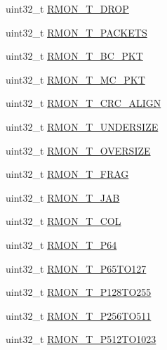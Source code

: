 \begin{DoxyCompactItemize}
\item 
uint32\+\_\+t \hyperlink{struct_e_n_e_t___mem_map_ad0d6e8aa41799a8c53de16163b293e44}{R\+M\+O\+N\+\_\+\+T\+\_\+\+D\+R\+O\+P}
\item 
uint32\+\_\+t \hyperlink{struct_e_n_e_t___mem_map_a50d2a3b07b1bc8cffcb140f1f1830aeb}{R\+M\+O\+N\+\_\+\+T\+\_\+\+P\+A\+C\+K\+E\+T\+S}
\item 
uint32\+\_\+t \hyperlink{struct_e_n_e_t___mem_map_ae71447acacfe736236413a9872954541}{R\+M\+O\+N\+\_\+\+T\+\_\+\+B\+C\+\_\+\+P\+K\+T}
\item 
uint32\+\_\+t \hyperlink{struct_e_n_e_t___mem_map_ac8d2c6366107a9a30857cb24e064b07a}{R\+M\+O\+N\+\_\+\+T\+\_\+\+M\+C\+\_\+\+P\+K\+T}
\item 
uint32\+\_\+t \hyperlink{struct_e_n_e_t___mem_map_a91748ae65113321a609bfe426b10dcaf}{R\+M\+O\+N\+\_\+\+T\+\_\+\+C\+R\+C\+\_\+\+A\+L\+I\+G\+N}
\item 
uint32\+\_\+t \hyperlink{struct_e_n_e_t___mem_map_aae80607f8598aca7702cb202de169cf2}{R\+M\+O\+N\+\_\+\+T\+\_\+\+U\+N\+D\+E\+R\+S\+I\+Z\+E}
\item 
uint32\+\_\+t \hyperlink{struct_e_n_e_t___mem_map_a56484cacaa1e824b8e8c9844d12402fc}{R\+M\+O\+N\+\_\+\+T\+\_\+\+O\+V\+E\+R\+S\+I\+Z\+E}
\item 
uint32\+\_\+t \hyperlink{struct_e_n_e_t___mem_map_ae3e453e00c8d5a0bb1438633491306b4}{R\+M\+O\+N\+\_\+\+T\+\_\+\+F\+R\+A\+G}
\item 
uint32\+\_\+t \hyperlink{struct_e_n_e_t___mem_map_a97f01390522ef9819ad5c2512fc78052}{R\+M\+O\+N\+\_\+\+T\+\_\+\+J\+A\+B}
\item 
uint32\+\_\+t \hyperlink{struct_e_n_e_t___mem_map_a7d783546e1ce7f9a661f7e0167f4ebcb}{R\+M\+O\+N\+\_\+\+T\+\_\+\+C\+O\+L}
\item 
uint32\+\_\+t \hyperlink{struct_e_n_e_t___mem_map_aabb287e28a91a136a3ff790db65f9041}{R\+M\+O\+N\+\_\+\+T\+\_\+\+P64}
\item 
uint32\+\_\+t \hyperlink{struct_e_n_e_t___mem_map_aab63a112810f076ec47359785a8e5690}{R\+M\+O\+N\+\_\+\+T\+\_\+\+P65\+T\+O127}
\item 
uint32\+\_\+t \hyperlink{struct_e_n_e_t___mem_map_a36a70fb4e317b97da61411890ee4718b}{R\+M\+O\+N\+\_\+\+T\+\_\+\+P128\+T\+O255}
\item 
uint32\+\_\+t \hyperlink{struct_e_n_e_t___mem_map_ada2b5719d5ae06d1d27108d7f2482ac5}{R\+M\+O\+N\+\_\+\+T\+\_\+\+P256\+T\+O511}
\item 
uint32\+\_\+t \hyperlink{struct_e_n_e_t___mem_map_a1fdb9e53b8cfaec93d305731ae79bead}{R\+M\+O\+N\+\_\+\+T\+\_\+\+P512\+T\+O1023}

\end{DoxyCompactItemize}
